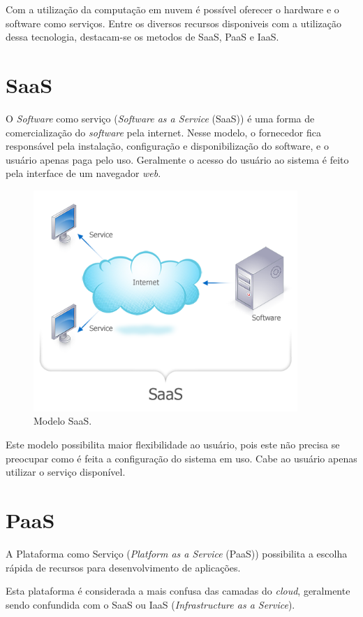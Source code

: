 \documentclass{abnt}
\begin{document}
	Com a utilização da computação em nuvem é possível oferecer o 
	hardware e o software como serviços. 
	Entre os diversos recursos disponiveis com a utilização dessa tecnologia, 
	destacam-se os metodos de SaaS, PaaS e IaaS.

	\section{SaaS}
	
	O \textit{Software} como serviço (\textit{Software as a Service} (SaaS)) é uma forma 
	de comercialização do \textit{software} pela internet. Nesse modelo, o fornecedor 
	fica responsável pela instalação, configuração e disponibilização do 
	software, e o usuário apenas paga pelo uso.
	Geralmente o acesso do usuário ao sistema é feito pela interface 
	de um navegador \textit{web}.

	\begin{figure}[h]
		\centering
		\includegraphics[width=10cm, keepaspectratio]{img/SaaS.png}
		\caption{Modelo SaaS.}
		\label{saas}
	\end{figure}
	
	Este modelo possibilita maior flexibilidade ao usuário, pois este não 
	precisa se preocupar como é feita a configuração do sistema em uso. Cabe 
	ao usuário apenas utilizar o serviço disponível.
	
	\section{PaaS}
		A Plataforma como Serviço (\textit{Platform as a Service} (PaaS)) possibilita a escolha rápida de recursos para desenvolvimento de aplicações.
		
		Esta plataforma é considerada a mais confusa das camadas do \textit{cloud}, geralmente sendo confundida com o SaaS ou IaaS (\textit{Infrastructure as a Service}).
		
\end{document}
